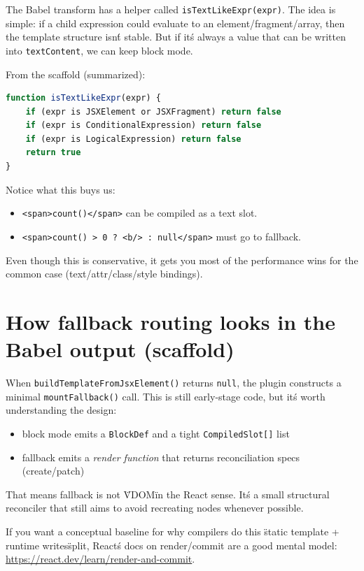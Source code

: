 The Babel transform has a helper called \texttt{isTextLikeExpr(expr)}.
The idea is simple: if a child expression could evaluate to an element/fragment/array, then the template structure isn\'t stable.
But if it\'s always a value that can be written into \texttt{textContent}, we can keep block mode.

From the scaffold (summarized):

\begin{lstlisting}[language=JavaScript]
function isTextLikeExpr(expr) {
	if (expr is JSXElement or JSXFragment) return false
	if (expr is ConditionalExpression) return false
	if (expr is LogicalExpression) return false
	return true
}
\end{lstlisting}

Notice what this buys us:

\begin{itemize}
\item \texttt{<span>{count()}</span>} can be compiled as a text slot.
\item \texttt{<span>{count() > 0 ? <b/> : null}</span>} must go to fallback.
\end{itemize}

Even though this is conservative, it gets you most of the performance wins for the common case (text/attr/class/style bindings).

\section{How fallback routing looks in the Babel output (scaffold)}

When \texttt{buildTemplateFromJsxElement()} returns \texttt{null}, the plugin constructs a minimal \texttt{mountFallback()} call.
This is still early-stage code, but it\'s worth understanding the design:

\begin{itemize}
\item block mode emits a \texttt{BlockDef} and a tight \texttt{CompiledSlot[]} list
\item fallback emits a \emph{render function} that returns reconciliation specs (create/patch)
\end{itemize}

That means fallback is not \"VDOM\" in the React sense.
It\'s a small structural reconciler that still aims to avoid recreating nodes whenever possible.

If you want a conceptual baseline for why compilers do this \"static template + runtime writes\" split, React\'s docs on render/commit are a good mental model:
\href{https://react.dev/learn/render-and-commit}{https://react.dev/learn/render-and-commit}.

